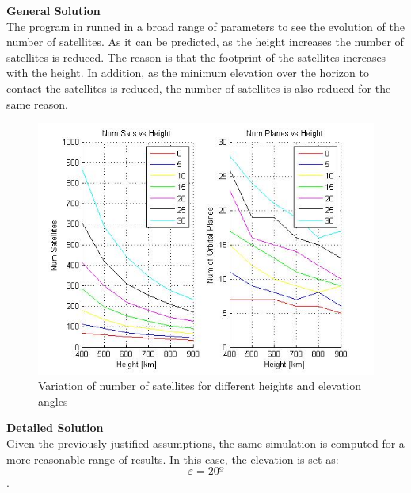 \textbf{General Solution}\\
The program in runned in a broad range of parameters to see the evolution of the number of satellites. As it can be predicted, as the height increases the number of satellites is reduced. The reason is that the footprint of the satellites increases with the height. In addition, as the minimum elevation over the horizon to contact the satellites is reduced, the number of satellites is also reduced for the same reason.

\begin{figure}[H]
\begin{center}
\includegraphics[scale=0.7]{PolarOrbits/GeneralResults.jpg}
\caption{Variation of number of satellites for different heights and elevation angles}
\end{center}
\end{figure}

\textbf{Detailed Solution}\\
Given the previously justified assumptions, the same simulation is computed for a more reasonable range of results. In this case, the elevation is set as: $$\varepsilon = 20º$$.

